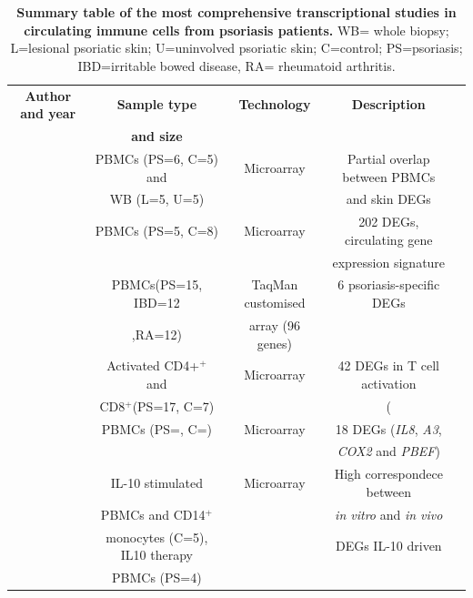 \begin{table}[htbp]
\centering
\begin{tabular}{@{} c c c c c}
\toprule
\textbf{Author and year} & \textbf{Sample type} & \textbf{Technology} & \textbf{Description}\\
                         & \textbf{and size}    &                     &                      \\
\midrule
\midrule
\parencite{Coda2012}   & PBMCs (PS=6, C=5) and    & Microarray        & Partial overlap between PBMCs \\
                       & WB (L=5, U=5)            &                   & and skin DEGs \\
\parencite{Lee2009}	   & PBMCs (PS=5, C=8)	      & Microarray        & 202 DEGs, circulating gene \\
                       &                          &                   & expression signature \\
\parencite{Mesko2015}  & PBMCs(PS=15, IBD=12      & TaqMan customised      & 6 psoriasis-specific DEGs \\
                       & ,RA=12)                  & array (96 genes)       &                           \\
\parencite{Palau2013}	 & Activated CD4+$^+$ and   & Microarray            & 42 DEGs in T cell activation\\
                       & CD8$^+$(PS=17, C=7)      &                       & (\textit{SPATS2L and \textit{KLF6}) \\                 
\parencite{Kozcan2005} & PBMCs (PS=, C=)	        & Microarray            & 18 DEGs (\textit{IL8}, \textit{A3}, \\
                       &                          &                       & \textit{COX2} and \textit{PBEF})  \\ 
\parencite{Jung2004}   & IL-10 stimulated         & Microarray            & High correspondece between \\
                       & PBMCs and CD14$^+$       &                       & \textit{in vitro} and \textit{in vivo} \\
											 & monocytes (C=5), IL10 therapy &                  & DEGs IL-10 driven \\  
											 & PBMCs (PS=4)             &                       &                    \\
\bottomrule
\end{tabular}
\medskip %
\caption[Summary table of the most comprehensive transcriptional studies in circulating immune cells from psoriasis patients.]{\textbf{Summary table of the most comprehensive transcriptional studies in circulating immune cells from psoriasis patients.} WB= whole biopsy; L=lesional psoriatic skin; U=uninvolved psoriatic skin; C=control; PS=psoriasis; IBD=irritable bowed disease, RA= rheumatoid arthritis.}
\label{tab:Psoriasis_blood_transcriptomics}
\end{table}
\bigskip %


